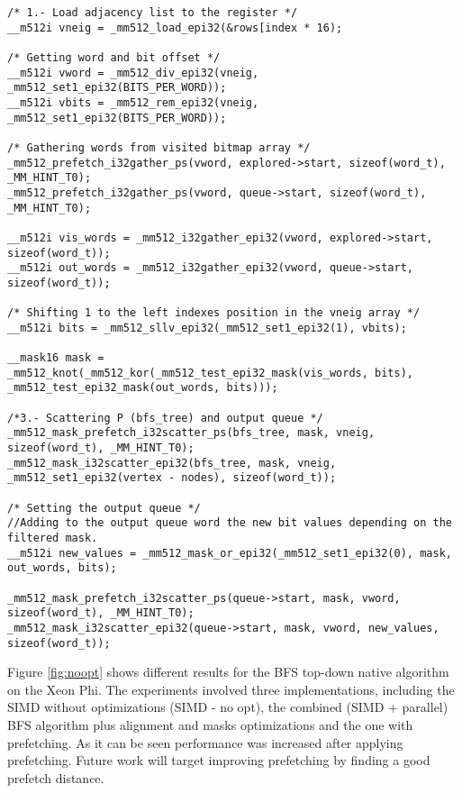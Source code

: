 \documentclass{sig-alternate-05-2015}
\begin{document}
\begin{lstlisting}[caption=Adjacency list exploration using SIMD intrinsic functions.,
                   label=listing:SIMDFlt]
/* 1.- Load adjacency list to the register */
__m512i vneig = _mm512_load_epi32(&rows[index * 16);
	
/* Getting word and bit offset */
__m512i vword = _mm512_div_epi32(vneig, _mm512_set1_epi32(BITS_PER_WORD));
__m512i vbits = _mm512_rem_epi32(vneig, _mm512_set1_epi32(BITS_PER_WORD));
	
/* Gathering words from visited bitmap array */
_mm512_prefetch_i32gather_ps(vword, explored->start, sizeof(word_t), _MM_HINT_T0);
_mm512_prefetch_i32gather_ps(vword, queue->start, sizeof(word_t), _MM_HINT_T0);

__m512i vis_words = _mm512_i32gather_epi32(vword, explored->start, sizeof(word_t));
__m512i out_words = _mm512_i32gather_epi32(vword, queue->start, sizeof(word_t));
	
/* Shifting 1 to the left indexes position in the vneig array */	
__m512i bits = _mm512_sllv_epi32(_mm512_set1_epi32(1), vbits);

__mask16 mask = _mm512_knot(_mm512_kor(_mm512_test_epi32_mask(vis_words, bits), _mm512_test_epi32_mask(out_words, bits)));

/*3.- Scattering P (bfs_tree) and output queue */
_mm512_mask_prefetch_i32scatter_ps(bfs_tree, mask, vneig, sizeof(word_t), _MM_HINT_T0);
_mm512_mask_i32scatter_epi32(bfs_tree, mask, vneig, _mm512_set1_epi32(vertex - nodes), sizeof(word_t));

/* Setting the output queue */
//Adding to the output queue word the new bit values depending on the filtered mask. 
__m512i new_values = _mm512_mask_or_epi32(_mm512_set1_epi32(0), mask, out_words, bits);

_mm512_mask_prefetch_i32scatter_ps(queue->start, mask, vword, sizeof(word_t), _MM_HINT_T0);
_mm512_mask_i32scatter_epi32(queue->start, mask, vword, new_values, sizeof(word_t));

\end{lstlisting}

 Figure \ref{fig:noopt} shows different results for the BFS top-down
 native algorithm on the Xeon Phi. The experiments involved three
 implementations, including the SIMD without optimizations (SIMD - no
 opt), the combined (SIMD + parallel) BFS algorithm plus alignment and
 masks optimizations and the one with prefetching. As it can be seen
 performance was increased after applying prefetching. Future work
 will target improving prefetching by finding a good prefetch
 distance.
 
\end{document}
